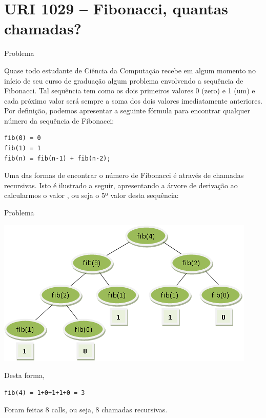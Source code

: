 \section{URI 1029 -- Fibonacci, quantas chamadas?}

\begin{frame}[fragile]{Problema}

Quase todo estudante de Ciência da Computação recebe em algum momento no início de seu curso de 
graduação algum problema envolvendo a sequência de Fibonacci. Tal sequência tem como os dois 
primeiros valores 0 (zero) e 1 (um) e cada próximo valor será sempre a soma dos dois valores 
imediatamente anteriores. Por definição, podemos apresentar a seguinte fórmula para encontrar 
qualquer número da sequência de Fibonacci:
\begin{verbatim}
fib(0) = 0
fib(1) = 1
fib(n) = fib(n-1) + fib(n-2);
\end{verbatim}

Uma das formas de encontrar o número de Fibonacci é através de chamadas recursivas. Isto é 
ilustrado a seguir, apresentando a árvore de derivação ao calcularmos o valor , ou 
seja o 5º valor desta sequência:
\end{frame}

\begin{frame}[fragile]{Problema}

\begin{center}
\includegraphics[scale=0.5]{figure.png}
\end{center}

Desta forma,
\begin{verbatim}
fib(4) = 1+0+1+1+0 = 3
\end{verbatim}
Foram feitas 8 calls, ou seja, 8 chamadas recursivas.
\end{frame}

